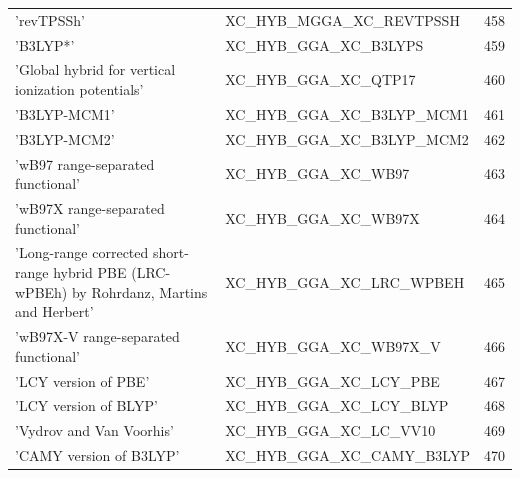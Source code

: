 \documentclass[final,12pt,makeidx,DIV=calc]{article}
\begin{document}
{{{{{{\begin{table}[!h]
\begin{center}
\begin{tabular}{llr}
  'revTPSSh' & XC\_HYB\_MGGA\_XC\_REVTPSSH  &458\\
  'B3LYP*' & XC\_HYB\_GGA\_XC\_B3LYPS  &459\\
  'Global hybrid for vertical ionization potentials' & XC\_HYB\_GGA\_XC\_QTP17  &460\\
  'B3LYP-MCM1' & XC\_HYB\_GGA\_XC\_B3LYP\_MCM1  &461\\
  'B3LYP-MCM2' & XC\_HYB\_GGA\_XC\_B3LYP\_MCM2  &462\\
  'wB97 range-separated functional' & XC\_HYB\_GGA\_XC\_WB97  &463\\
  'wB97X range-separated functional' & XC\_HYB\_GGA\_XC\_WB97X  &464\\
  'Long-range corrected short-range hybrid PBE (LRC-wPBEh) by Rohrdanz, Martins and Herbert' & XC\_HYB\_GGA\_XC\_LRC\_WPBEH  &465\\
  'wB97X-V range-separated functional' & XC\_HYB\_GGA\_XC\_WB97X\_V  &466\\
  'LCY version of PBE' & XC\_HYB\_GGA\_XC\_LCY\_PBE  &467\\
  'LCY version of BLYP' & XC\_HYB\_GGA\_XC\_LCY\_BLYP  &468\\
  'Vydrov and Van Voorhis' & XC\_HYB\_GGA\_XC\_LC\_VV10  &469\\
  'CAMY version of B3LYP' & XC\_HYB\_GGA\_XC\_CAMY\_B3LYP  &470\\
\end{tabular}
\end{center}
\end{table}

}}}}}}
\end{document}
